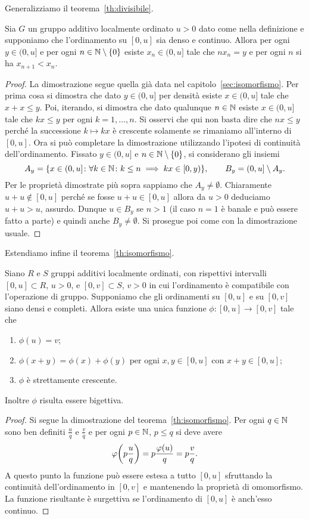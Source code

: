 Generalizziamo il teorema~\ref{th:divisibile}.
\begin{theorem}
Sia $G$ un gruppo additivo localmente ordinato
$u>0$ dato come nella definizione
e supponiamo che l'ordinamento su $[0,u]$ sia denso e continuo.
Allora per ogni $y\in(0,u]$ 
e per ogni $n\in {\mathbb N}\setminus{\left\{ 0 \right\}}$ 
esiste $x_n\in(0,u]$ tale che 
$n x_n = y$ e per ogni $n$ si ha $x_{n+1}< x_n$.
\end{theorem}
%
\begin{proof}
La dimostrazione segue quella già data nel capitolo~\ref{sec:isomorfismo}.
Per prima cosa si dimostra che dato $y\in(0,u]$ 
per densità esiste $x\in (0,u]$ tale che $x+x\le y$.
Poi, iterando, si dimostra che dato qualunque $n\in {\mathbb N}$ 
esiste $x\in (0,u]$ tale che $kx\le y$ per ogni $k=1,\dots, n$.
Si osservi che qui non basta dire che $nx\le y$ perché 
la successione $k\mapsto kx$ è crescente solamente se rimaniamo 
all'interno di $[0,u]$.
Ora si può completare la dimostrazione utilizzando l'ipotesi di 
continuità dell'ordinamento. 
Fissato $y\in(0,u]$ e $n\in {\mathbb N}\setminus{\left\{ 0 \right\}}$, 
si considerano gli insiemi 
\[
  A_y = {\left\{ x\in(0,u]\colon \forall k\in {\mathbb N}\colon k\le n\implies kx \in [0,y)  \right\}},
  \qquad 
  B_y = (0,u] \setminus A_y.
\]
Per le proprietà dimostrate più sopra sappiamo che $A_y \neq \emptyset$.
Chiaramente $u+u\not \in[0,u]$ perché se fosse $u+u\in[0,u]$ allora 
da $u>0$ deduciamo $u+u>u$, assurdo. 
Dunque $u\in B_y$ se $n>1$ (il caso $n=1$ è banale e può essere fatto 
a parte) e quindi anche $B_y\neq \emptyset$.
Si prosegue poi come con la dimostrazione usuale.
\end{proof}

Estendiamo infine il teorema~\ref{th:isomorfismo}.
%
\begin{theorem}[omomorfismo]
  \label{th:omomorfismo_U}
Siano $R$ e $S$ gruppi additivi localmente ordinati, con rispettivi 
intervalli $[0,u]\subset R$, $u>0$, e $[0,v]\subset S$, 
$v>0$ in cui l'ordinamento 
è compatibile con l'operazione di gruppo.
Supponiamo che gli ordinamenti su $[0,u]$ e su $[0,v]$ siano densi e completi.
Allora esiste una unica funzione $\phi\colon [0,u]\to[0,v]$ tale che 
\begin{enumerate}
  \item $\phi(u)=v$;
  \item $\phi(x+y) = \phi(x)+\phi(y)$ per ogni $x,y\in [0,u]$ con $x+y\in [0,u]$;
  \item $\phi$ è strettamente crescente.
\end{enumerate}
Inoltre $\phi$ risulta essere bigettiva.
\end{theorem}
%
\begin{proof}
Si segue la dimostrazione del teorema~\ref{th:isomorfismo}.
Per ogni $q\in {\mathbb N}$ sono ben definiti $\frac u q$ e $\frac v q$ 
e per ogni $p\in {\mathbb N}$, $p\le q$ si deve 
avere
\[
    \varphi{\left( p\frac u q \right)} = p \frac{\varphi(u)} q = p \frac{v}{q}.
\]
A questo punto la funzione può essere estesa a tutto $[0,u]$ 
sfruttando la continuità dell'ordinamento in $[0,v]$ e mantenendo 
la proprietà di omomorfismo.
La funzione risultante è surgettiva se l'ordinamento 
di $[0,u]$ è anch'esso continuo.
\end{proof}

